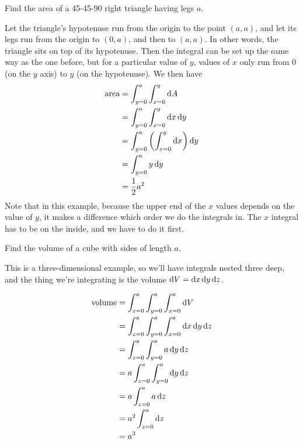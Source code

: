 \begin{eg}
\egquestion Find the area of a 45-45-90 right triangle having legs $a$.

\eganswer Let the triangle's hypotenuse run from the origin to the point $(a,a)$,
and let its legs run from the origin to $(0,a)$, and then to $(a,a)$. In other
words, the triangle sits on top of its hypotenuse. Then the integral can be set
up the same way as the one before, but for a particular value of $y$, values of
$x$ only run from 0 (on the $y$ axis) to $y$ (on the hypotenuse). We then have
\begin{align*}
  \text{area} &= \int_{y=0}^a \int_{x=0}^y \operatorname{d\!} A \\
              &= \int_{y=0}^a \int_{x=0}^y \operatorname{d\!} x \operatorname{d\!} y \\
              &= \int_{y=0}^a \left(\int_{x=0}^y \operatorname{d\!} x\right) \operatorname{d\!} y \\
              &= \int_{y=0}^a y \operatorname{d\!} y \\
              &= \frac{1}{2}a^2
\end{align*}
Note that in this example, because the upper end of the $x$ values depends
on the value of $y$, it makes a difference which order we do the integrals
in. The $x$ integral has to be on the inside, and we have to do it first.
\end{eg}

\begin{eg}
\egquestion Find the volume of a cube with sides of length $a$.

\eganswer This is a three-dimensional example, so we'll have integrals
nested three deep, and the thing we're integrating is the volume
$\operatorname{d\!} V = \operatorname{d\!} x \operatorname{d\!} y \operatorname{d\!} z$.

\begin{align*}
  \text{volume} &= \int_{z=0}^a \int_{y=0}^a \int_{x=0}^a \der V \\
              &= \int_{z=0}^a \int_{y=0}^a \int_{x=0}^a \der x \der y \der z \\
              &= \int_{z=0}^a \int_{y=0}^a a \der y \der z \\
              &= a \int_{z=0}^a \int_{y=0}^a \der y \der z \\
              &= a \int_{z=0}^a a \der z \\
              &= a^2 \int_{z=0}^a \der z \\
              &= a^3
\end{align*}
\end{eg}

